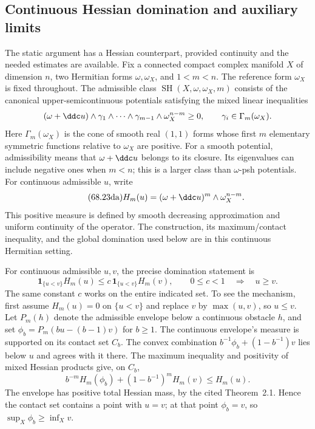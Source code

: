 \subsection{Continuous Hessian domination and auxiliary limits}
\label{sec:ytd-continuous-hessian-domination}

The static argument has a Hessian counterpart, provided continuity
and the needed estimates are available. Fix a connected compact
complex manifold $X$ of dimension $n$, two Hermitian forms
$\omega,\omega_X$, and $1<m<n$. The reference form $\omega_X$
is fixed throughout. The admissible class
$\operatorname{SH}(X,\omega,\omega_X,m)$ consists of the canonical
upper-semicontinuous potentials satisfying the mixed linear
inequalities
\[
 (\omega+\ddc u)\wedge\gamma_1\wedge\cdots\wedge
       \gamma_{m-1}\wedge\omega_X^{n-m}\geq0,
 \qquad \gamma_i\in\Gamma_m(\omega_X).
\]
Here $\Gamma_m(\omega_X)$ is the cone of smooth real $(1,1)$ forms
whose first $m$ elementary symmetric functions relative to
$\omega_X$ are positive. For a smooth potential, admissibility
means that $\omega+\ddc u$ belongs to its closure. Its eigenvalues
can include negative ones when $m<n$; this is a larger class than
$\omega$-psh potentials. For continuous admissible $u$, write
\[
\tag{68.23da}\label{eq:ytd-continuous-hessian-operator}
 H_m(u)=(\omega+\ddc u)^m\wedge\omega_X^{n-m}.
\]
This positive measure is defined by smooth decreasing approximation
and uniform continuity of the operator. The construction, its
maximum/contact inequality, and the global domination used below
are \cite[Sections~1.1--2]{GuedjLu23HessianV1} in this continuous
Hermitian setting.

For continuous admissible $u,v$, the precise domination statement is
\[
\tag{68.23db}\label{eq:ytd-continuous-hessian-domination}
 \mathbf1_{\{u<v\}}H_m(u)
       \leq c\,\mathbf1_{\{u<v\}}H_m(v),
 \qquad 0\leq c<1
 \quad\Longrightarrow\quad u\geq v.
\]
The same constant $c$ works on the entire indicated set. To see the
mechanism, first assume $H_m(u)=0$ on $\{u<v\}$ and replace $v$
by $\max(u,v)$, so $u\leq v$. Let $P_m(h)$ denote the admissible
envelope below a continuous obstacle $h$, and set
$\phi_b=P_m(bu-(b-1)v)$ for $b\geq1$. The continuous envelope's
measure is supported on its contact set $C_b$. The convex
combination $b^{-1}\phi_b+(1-b^{-1})v$ lies below $u$ and agrees
with it there. The maximum inequality and positivity of mixed
Hessian products give, on $C_b$,
\[
 b^{-m}H_m(\phi_b)+(1-b^{-1})^mH_m(v)\leq H_m(u).
\]
The envelope has positive total Hessian mass, by the cited
Theorem~2.1. Hence the contact set contains a point with $u=v$;
at that point $\phi_b=v$, so $\sup_X\phi_b\geq\inf_Xv$.

